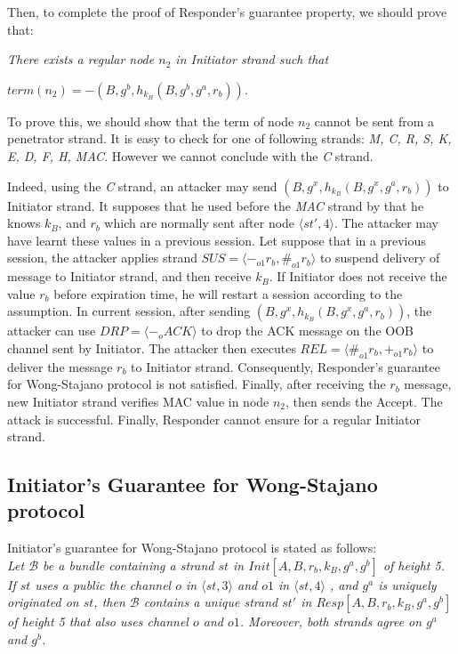 Then, to complete the proof of Responder's guarantee property, we should prove that:
 
\textit{There exists a regular node $n_2$ in Initiator strand such that} \begin{center}$term(n_2) = -(B, g^b, h_{k_B}(B,g^b,g^a,r_b))$.\end{center}

To prove this, we should show that the term of node $n_2$ cannot be sent from a penetrator strand. It is easy to check for one of following strands: \textit{M, C, R, S, K, E, D, F, H, MAC}. However we cannot conclude with the \textit{C} strand.

Indeed, using the \textit{C} strand, an attacker may send $(B, g^{x}, h_{k_B}(B,g^{x},g^a,r_b))$ to Initiator strand. 
It supposes that he used before the \textit{MAC} strand by that he knows $k_B$, and $r_b$ which are normally sent after node $\langle st',4 \rangle$. The attacker may have learnt these values in a previous session. Let suppose that in a previous session, the attacker applies strand $SUS = \langle -_{o1} r_b,\#_{o1} r_b \rangle$ to suspend delivery of message to Initiator strand, and then receive $k_B$. If Initiator does not receive the value $r_b$ before expiration time, he will restart a session according to the assumption. In current session, after sending $(B, g^{x}, h_{k_B}(B,g^{x},g^a,r_b))$, the attacker can use $DRP = \langle -_o ACK \rangle$ to drop the ACK message on the OOB channel sent by Initiator. The attacker then executes $REL= \langle \#_{o1} r_b,+_{o1} r_b \rangle$ to deliver the message $r_b$ to Initiator strand. Consequently, Responder's guarantee for Wong-Stajano protocol is not satisfied. Finally, after receiving the $r_b$ message, new Initiator strand verifies MAC value in node $n_2$, then sends the Accept. The attack is successful. Finally, Responder cannot ensure for a regular Initiator strand. 

\subsection{Initiator's Guarantee for Wong-Stajano protocol}

Initiator's guarantee for Wong-Stajano protocol is stated as follows:\\
\textit{
Let $\mathcal{B}$ be a bundle containing a strand $st$ in $Init[A,B,r_b, k_B,g^a,g^b]$ of height 5. If $st$ uses a public the channel $o$ in $\langle st,3 \rangle$ and $o1$ in $\langle st,4 \rangle$ , and $g^a$ is uniquely originated on $st$, then $\mathcal{B}$ contains a unique strand $st'$ in $Resp[A,B,r_b, k_B,g^a,g^b]$ of height 5 that also uses channel $o$ and $o1$. Moreover, both strands agree on $g^a$ and $g^b$.
}

